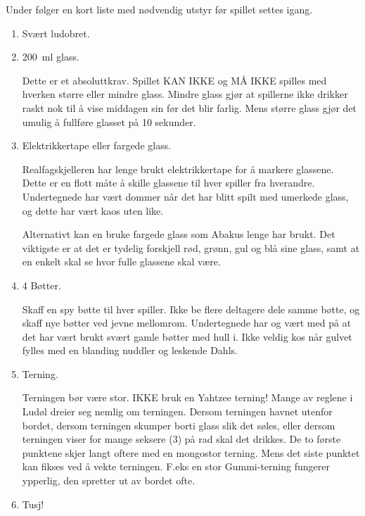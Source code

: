 \documentclass[10pt,a4paper,norsk,openany]{book}
\begin{document}
Under følger en kort liste med nødvendig utstyr før spillet settes igang.

\begin{enumerate}

  \item Svært ludobret.

  \item \SI{200}{\ml} glass.

    Dette er et absoluttkrav. Spillet KAN IKKE og MÅ IKKE spilles med hverken større
    eller mindre glass. Mindre glass gjør at spillerne ikke drikker raskt nok til å
    vise middagen sin før det blir farlig. Mens større glass gjør det umulig å
    fullføre glasset på 10 sekunder.

  \item Elektrikkertape eller fargede glass.

    Realfagskjelleren har lenge brukt elektrikkertape for å markere glassene. Dette er en
    flott måte å skille glassene til hver spiller fra hverandre. Undertegnede har
    vært dommer når det har blitt spilt med umerkede glass, og dette har vært kaos
    uten like.

    Alternativt kan en bruke fargede glass som Abakus lenge har brukt. Det viktigste
    er at det er tydelig forskjell rød, grønn, gul og blå sine glass, samt at en
    enkelt skal se hvor fulle glassene skal være.

  \item 4 Bøtter.

    Skaff en spy bøtte til hver spiller. Ikke be flere deltagere dele samme bøtte,
    og skaff nye bøtter ved jevne mellomrom. Undertegnede har og vært med på at det
    har vært brukt svært gamle bøtter med hull i. Ikke veldig kos når gulvet fylles
    med en blanding nuddler og leskende Dahls.

  \item Terning.

    Terningen bør være stor. IKKE bruk en Yahtzee terning! Mange av reglene i Ludøl
    dreier seg nemlig om terningen. Dersom terningen havnet utenfor bordet, dersom
    terningen skumper borti glass slik det søles, eller dersom terningen
    viser for mange seksere (3) på rad skal det drikkes. De to første punktene skjer
    langt oftere med en mongostor terning. Mens det siste punktet kan fikses ved å
    vekte terningen. F.eks en stor Gummi-terning fungerer ypperlig, den spretter ut
    av bordet ofte.

  \item Tusj!


\end{enumerate}
\end{document}
